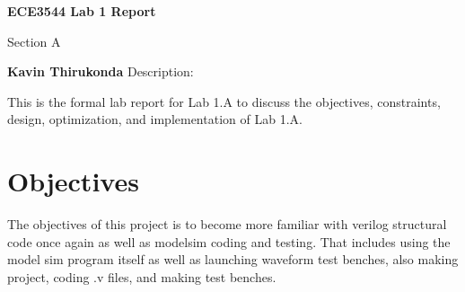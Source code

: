 \documentclass{article}
\begin{document}
\begin{center}
    \vspace*{1cm}
    \Huge
    \textbf{ECE3544 Lab 1 Report}
    
    \vspace{0.5cm}
    \LARGE
    Section A
    
    \vspace{1.5cm}
    \textbf{Kavin Thirukonda}
    \vfill
    \small
    Description:
    
    This is the formal lab report for Lab 1.A to discuss the objectives, constraints, design, optimization, and implementation of Lab 1.A.
    \vspace{10cm}
\end{center}
\newpage
\section{Objectives}
The objectives of this project is to become more familiar with verilog structural code once again as well as modelsim coding and testing. That includes using the model sim program itself as well as launching waveform test benches, also making project, coding .v files, and making test benches.
\end{document}
